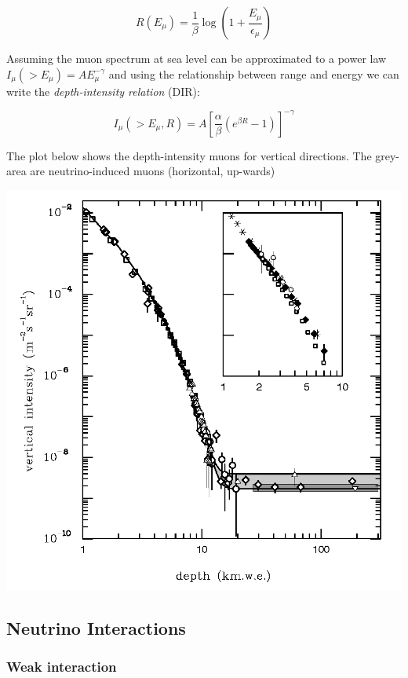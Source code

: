 \documentclass[
  letterpaper,
  DIV=11,
  numbers=noendperiod]{scrreprt}
\begin{document}
\[ R(E_\mu) = \frac{1}{\beta}\log\left( 1 + \frac{E_\mu}{\epsilon_\mu}\right)\]

Assuming the muon spectrum at sea level can be approximated to a power
law \(I_\mu(>E_\mu) = AE_\mu^{-\gamma}\) and using the relationship
between range and energy we can write the \emph{depth-intensity
relation} (DIR):

\[I_\mu(>E_\mu, R) = A\left[\frac{\alpha}{\beta}(e^{\beta R} - 1)\right]^{-\gamma}\]

The plot below shows the depth-intensity muons for vertical directions.
The grey-area are neutrino-induced muons (horizontal, up-wards)

\includegraphics{images/muon-depth.png}

\subsection*{Neutrino Interactions}\label{neutrino-interactions}

\subsubsection*{Weak interaction}\label{weak-interaction}
\end{document}
